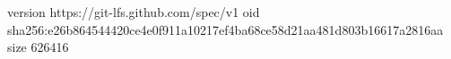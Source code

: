 version https://git-lfs.github.com/spec/v1
oid sha256:e26b864544420ce4e0f911a10217ef4ba68ce58d21aa481d803b16617a2816aa
size 626416
